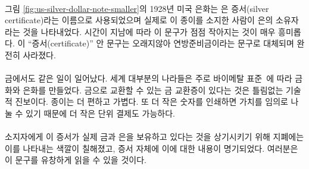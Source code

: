 \paragraph{}
\begin{comment}
	Note that the 1928 U.S. silver dollar in
	Figure~\ref{fig:us-silver-dollar-note-smaller} still goes by the name of
	\textit{silver certificate}, indicating that this is indeed simply a document
	stating that the bearer of this piece of paper is owed a piece of silver. It is
	interesting to see that the text which indicates this got smaller over time. The
	trace of \enquote{certificate} vanished completely after a while, being replaced
	by the reassuring statement that these are federal reserve notes.
\end{comment}
그림 \ref{fig:us-silver-dollar-note-smaller}의 1928년 미국 은화는 은 증서(silver certificate)라는
이름으로 사용되었으며 실제로 이 종이를 소지한 사람이 은의 소유자라는 것을 나타내었다. 
시간이 지남에 따라 이 문구가 점점 작아지는 것이 매우 흥미롭다. 
이 \enquote{증서(certificate)} 안 문구는 오래지않아 연방준비금이라는 문구로 대체되며 완전히 사라졌다.

\paragraph{}
\begin{comment}
	As mentioned above, the same thing happened to gold. Most of the world was on a
	bimetallic standard~\cite{wiki:bimetallism}, meaning coins were made
	primarily of gold and silver. Having certificates for gold, redeemable in gold
	coins, was arguably a technological improvement. Paper is more convenient,
	lighter, and since it can be divided arbitrarily by simply printing a smaller
	number on it, it is easier to break into smaller units.
\end{comment}
금에서도 같은 일이 일어났다. 
세계 대부분의 나라들은 주로 바이메탈 표준~\cite{wiki:bimetallism}에 따라 금화와 은화를 만들었다. 
금으로 교환할 수 있는 금 교환증이 있다는 것은 틀림없는 기술적 진보이다.
종이는 더 편하고 가볍다. 또 더 작은 숫자를 인쇄하면 가치를 임의로 나눌 수 있기 때문에 더 작은 단위 결제도 가능하다.

\paragraph{}
\begin{comment}
	To remind the bearers (users) that these certificates were
	representative for actual gold and silver, they were colored accordingly
	and stated this clearly on the certificate itself. You can fluently read
	the writing from top to bottom:
\end{comment}
소지자에게 이 증서가 실제 금과 은을 보유하고 있다는 것을 상기시키기 위해 지폐에는 이를 나타내는 색깔이 칠해졌고, 
증서 자체에 이에 대한 내용이 명기되었다. 여러분은 이 문구를 유창하게 읽을 수 있을 것이다.

